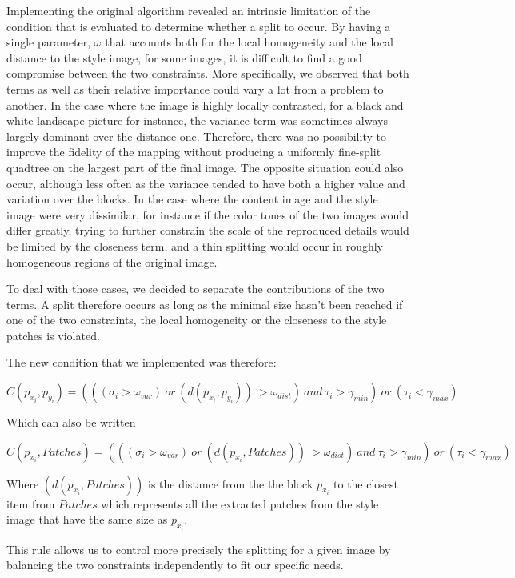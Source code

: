 \documentclass[a4paper]{article}
\begin{document}
Implementing the original algorithm revealed an intrinsic limitation of the condition that is evaluated to determine whether a split to occur. By having a single parameter, ${\omega}$ that accounts both for the local homogeneity and the local distance to the style image, for some images, it is difficult to find a good compromise between the two constraints. 
More specifically, we observed that both terms as well as their relative importance could vary a lot from a problem to another.
In the case where the image is highly locally contrasted, for a black and white landscape picture for instance, the variance term was sometimes always largely dominant over the distance one. Therefore, there was no possibility to improve the fidelity of the mapping without producing a uniformly fine-split quadtree on the largest part of the final image.
The opposite situation could also occur, although less often as the variance tended to have both a higher value and variation over the blocks. In the case where the content image and the style image were very dissimilar, for instance if the color tones of the two images would differ greatly, trying to further constrain the scale of the reproduced details would be limited by the closeness term, and a thin splitting would occur in roughly homogeneous regions of the original image.


To deal with those cases, we decided to separate the contributions of the two terms. A split therefore occurs as long as the minimal size hasn't been reached if one of the two constraints, the local homogeneity or the closeness to the style patches is violated.

The new condition that we implemented was therefore:



\[ C(p_{x_i}, p_{y_i}) =  (((\sigma_i  > \omega_{var}) \ or \ (d(p_{x_i}, p_{y_i}) )\ > \omega_{dist}) \  and  \ \tau_i  > \gamma_{min}) \ or \ (\tau_i < \gamma_{max}) \] 

Which can also be written 

\[ C(p_{x_i}, Patches) =  (((\sigma_i  > \omega_{var}) \ or \ (d(p_{x_i}, Patches) )\ > \omega_{dist}) \  and  \ \tau_i  > \gamma_{min}) \ or \ (\tau_i < \gamma_{max}) \] 

Where $(d(p_{x_i}, Patches) )$ is the distance from the the block $p_{x_i}$ to the closest item from $Patches$ which represents all the extracted patches from the style image that have the same size as $p_{x_i}$. 

This rule allows us to control more precisely the splitting for a given image by balancing the two constraints independently to fit our specific needs.
\end{document}

